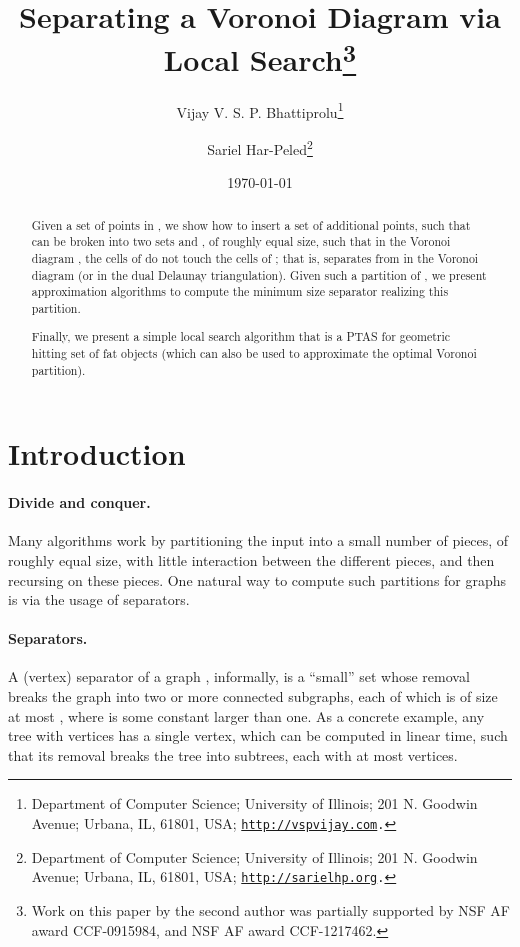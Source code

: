 \InSubmitVer{\documentclass[11pt]{article}}
\numberwithin{figure}{section}
\numberwithin{table}{section}
\numberwithin{equation}{section}
\newcommand{\Term}[1]{\textsf{#1}}
\newcommand{\PTAS}{\Term{PTAS}\xspace}
\newcommand{\SarielThanks}[1]{\thanks{Department of Computer Science; University of Illinois; 201 N. Goodwin Avenue; Urbana, IL, 61801, USA; {\tt \url{http://sarielhp.org}.} #1}
}
\newcommand{\VijayThanks}[1]{\thanks{Department of Computer Science; University of Illinois; 201 N. Goodwin Avenue; Urbana, IL, 61801, USA; {\tt \url{http://vspvijay.com}.} #1
   }
}
\begin{document}
\InSubmitVer{\linenumbers}

\title{Separating a Voronoi Diagram via Local Search\footnote{Work on this paper by the second author was partially supported
      by NSF AF award CCF-0915984, and NSF AF award CCF-1217462.}}

\author{Vijay V. S. P.  Bhattiprolu\VijayThanks{}\and Sariel Har-Peled\SarielThanks{}}\date{\today}

\maketitle

\begin{abstract}
    Given a set  of  points in , we show how to
    insert a set  of  additional points,
    such that  can be broken into two sets  and
    , of roughly equal size, such that in the Voronoi
    diagram , the cells of  do
    not touch the cells of ; that is,  separates
     from  in the Voronoi diagram (or in the
    dual Delaunay triangulation).  Given such a partition
     of , we present approximation
    algorithms to compute the minimum size separator realizing this
    partition.

    Finally, we present a simple local search algorithm that is a
    \PTAS for geometric hitting set of fat objects (which can also be
    used to approximate the optimal Voronoi partition).
\end{abstract}


\InSubmitVer{\thispagestyle{empty}\newpage \setcounter{page}{1}}


\section{Introduction}

\paragraph{Divide and conquer.}
Many algorithms work by partitioning the input into a small number of
pieces, of roughly equal size, with little interaction between the
different pieces, and then recursing on these pieces. One natural way
to compute such partitions for graphs is via the usage of separators.

\paragraph{Separators.}
A (vertex) separator of a graph ,
informally, is a ``small'' set  whose
removal breaks the graph into two or more connected subgraphs, each of
which is of size at most , where  is some constant larger than
one. As a concrete example, any tree with  vertices has a single
vertex, which can be computed in linear time, such that its removal
breaks the tree into subtrees, each with at most  vertices.
\end{document}
